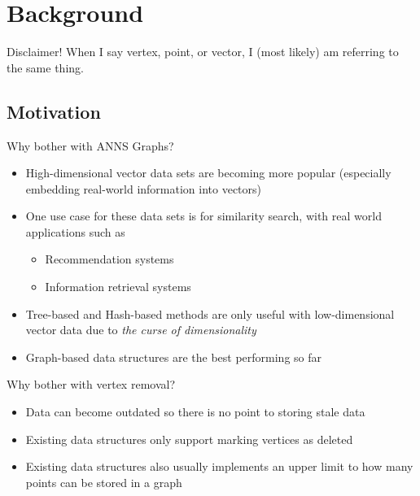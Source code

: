 \section{Background}

\begin{frame}{Disclaimer!}
    When I say vertex, point, or vector, I (most likely) am referring to the same thing.
\end{frame}

\subsection{Motivation}

\begin{frame}{Why bother with ANNS Graphs?}
    \begin{itemize}
        \item High-dimensional vector data sets are becoming more popular (especially embedding real-world information into vectors)
        \item One use case for these data sets is for similarity search, with real world applications such as
            \begin{itemize}
                \item Recommendation systems
                \item Information retrieval systems
            \end{itemize}
        \item Tree-based and Hash-based methods are only useful with low-dimensional vector data due to \textit{the curse of dimensionality}
        \item Graph-based data structures are the best performing so far
    \end{itemize}
\end{frame}

\begin{frame}{Why bother with vertex removal?}
    \begin{itemize}
        \item Data can become outdated so there is no point to storing stale data
        \item Existing data structures only support marking vertices as deleted 
        \item Existing data structures also usually implements an upper limit to how many points can be stored in a graph
    \end{itemize}
\end{frame}

